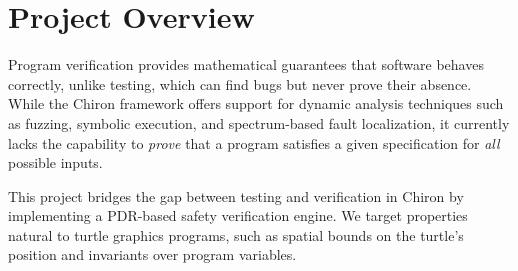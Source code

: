 \section*{Project Overview}
Program verification provides mathematical guarantees that software behaves correctly, unlike testing, which can find bugs but never prove their absence. While the Chiron framework offers support for dynamic analysis techniques such as fuzzing, symbolic execution, and spectrum-based fault localization, it currently lacks the capability to \textit{prove} that a program satisfies a given specification for \textit{all} possible inputs.

This project bridges the gap between testing and verification in Chiron by implementing a PDR-based safety verification engine. We target properties natural to turtle graphics programs, such as spatial bounds on the turtle's position and invariants over program variables.